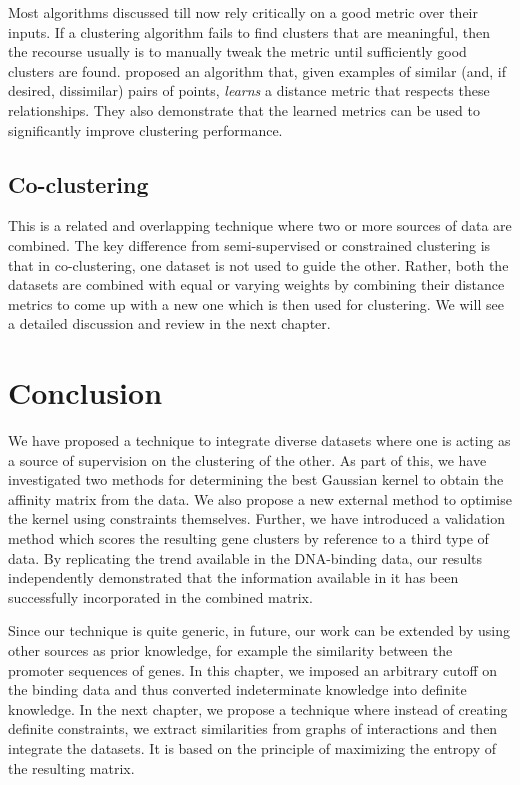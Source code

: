 Most algorithms discussed till now rely critically on a good metric over their inputs. If a clustering algorithm fails to find clusters that are meaningful, then the recourse usually is to manually tweak the metric until sufficiently good clusters are found. \citet{xing2003metric} proposed an algorithm that, given examples of similar (and, if desired, dissimilar) pairs of points, \textit{learns} a distance metric that respects these relationships. They also demonstrate that the learned metrics can be used to significantly improve clustering performance. 

\subsection{Co-clustering}
This is a related and overlapping technique where two or more sources of data are combined. The key difference from semi-supervised or constrained clustering is that in co-clustering, one dataset is not used to guide the other. Rather, both the datasets are combined with equal or varying weights by combining their distance metrics to come up with a new one which is then used for clustering. We will see a detailed discussion and review in the next chapter.

\section{Conclusion}

We have proposed a technique to integrate diverse datasets where one is acting as a source of supervision on the clustering of the other. As part of this, we have investigated two methods for determining the best Gaussian kernel to obtain the affinity matrix from the data. We also propose a new external method to optimise the kernel using constraints themselves. Further, we have introduced a validation method which scores the resulting gene clusters by reference to a third type of data. By replicating the trend available in the DNA-binding data, our results independently demonstrated that the information available in it has been successfully incorporated in the combined matrix. 

Since our technique is quite generic, in future, our work can be extended by using other sources as prior knowledge, for example the similarity between the promoter sequences of genes. In this chapter, we imposed an arbitrary cutoff on the binding data and thus converted indeterminate knowledge into definite knowledge. In the next chapter, we propose a technique where instead of creating definite constraints, we extract similarities from graphs of interactions and then integrate the datasets. It is based on the principle of maximizing the entropy of the resulting matrix. 

